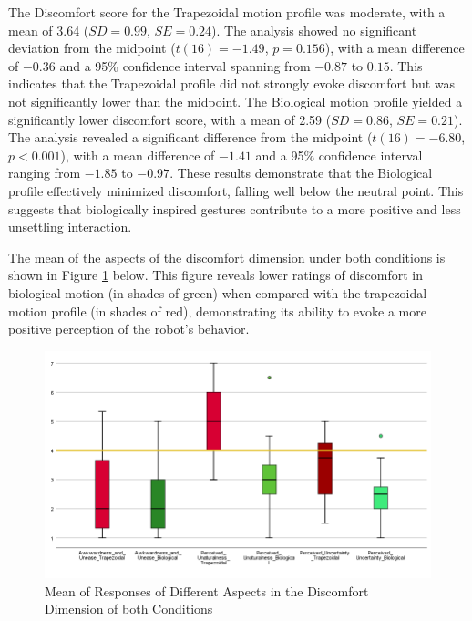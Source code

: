 \documentclass{CSSRforAfrica}
\begin{document}
The Discomfort score for the Trapezoidal motion profile was moderate, with a mean of 3.64 ($SD = 0.99$, $SE = 0.24$). The analysis showed no significant deviation from the midpoint ($t(16) = -1.49$, $p = 0.156$), with a mean difference of $-0.36$ and a 95\% confidence interval spanning from $-0.87$ to $0.15$. This indicates that the Trapezoidal profile did not strongly evoke discomfort but was not significantly lower than the midpoint.
The Biological motion profile yielded a significantly lower discomfort score, with a mean of 2.59 ($SD = 0.86$, $SE = 0.21$). The analysis revealed a significant difference from the midpoint ($t(16) = -6.80$, $p < 0.001$), with a mean difference of $-1.41$ and a 95\% confidence interval ranging from $-1.85$ to $-0.97$. These results demonstrate that the Biological profile effectively minimized discomfort, falling well below the neutral point.
This suggests that biologically inspired gestures contribute to a more positive and less unsettling interaction.

The mean of the aspects of the discomfort dimension under both conditions is shown in Figure \ref{figure:Discomfort_means} below. This figure reveals lower ratings of discomfort in biological motion  (in shades of green) when compared with the trapezoidal motion profile  (in shades of red), demonstrating its ability to evoke a more positive perception of the robot's behavior.
\begin{figure}[t]
  \centering \includegraphics[scale=0.45]{Discomfort_Means.png}
  \caption{Mean of Responses of Different Aspects in the Discomfort Dimension of both Conditions}
  \label{figure:Discomfort_means}
\end{figure}
\end{document}
